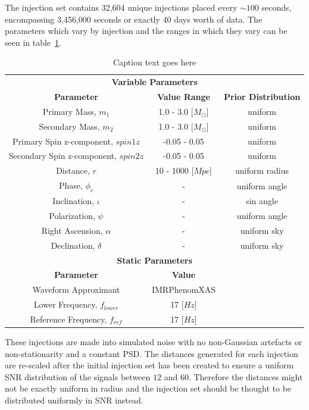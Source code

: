 The injection set contains 32,604 unique injections placed every $\sim100$ seconds, encompassing 3,456,000 seconds or exactly 40 days worth of data. The parameters which vary by injection and the ranges in which they vary can be seen in table~\ref{6:tab:ew_inj_params}.
%
\begin{table}[ht]
    \centering
    \setlength{\tabcolsep}{4pt}
    \begin{tabular}{ccc}
        \toprule
        \multicolumn{3}{c}{\textbf{Variable Parameters}} \\
        \cmidrule(lr){1-3}
        \textbf{Parameter} & \textbf{Value Range} & \textbf{Prior Distribution} \\
        \midrule
        Primary Mass, $m_1$ & 1.0 - 3.0 [$M_{\odot}$] & uniform \\
        Secondary Mass, $m_2$ & 1.0 - 3.0 [$M_{\odot}$] & uniform \\
        Primary Spin z-component, $spin1z$ & -0.05 - 0.05 & uniform \\
        Secondary Spin z-component, $spin2z$ & -0.05 - 0.05 & uniform \\
        Distance, $r$ & 10 - 1000 [$Mpc$] & uniform radius \\
        Phase, $\phi_{c}$ & - & uniform angle \\
        Inclination, $\iota$ & - & sin angle \\
        Polarization, $\psi$ & - & uniform angle \\
        Right Ascension, $\alpha$ & - & uniform sky \\
        Declination, $\delta$ & - & uniform sky \\
        \bottomrule
        \multicolumn{3}{c}{\textbf{Static Parameters}} \\
        \cmidrule(lr){1-3}
        \textbf{Parameter} & \textbf{Value} & \textbf{} \\
        \midrule
        Waveform Approximant & IMRPhenomXAS & \\
        Lower Frequency, $f_{lower}$ & 17 [$Hz$] & \\
        Reference Frequency, $f_{ref}$ & 17 [$Hz$] & \\
        \bottomrule
    \end{tabular}
    \caption{Caption text goes here}
    \label{6:tab:ew_inj_params}
\end{table}
%
These injections are made into simulated noise with no non-Gaussian artefacts or non-stationarity and a constant PSD. The distances generated for each injection are re-scaled after the initial injection set has been created to ensure a uniform SNR distribution of the signals between $12$ and $60$. Therefore the distances might not be exactly uniform in radius and the injection set should be thought to be distributed uniformly in SNR instead.

